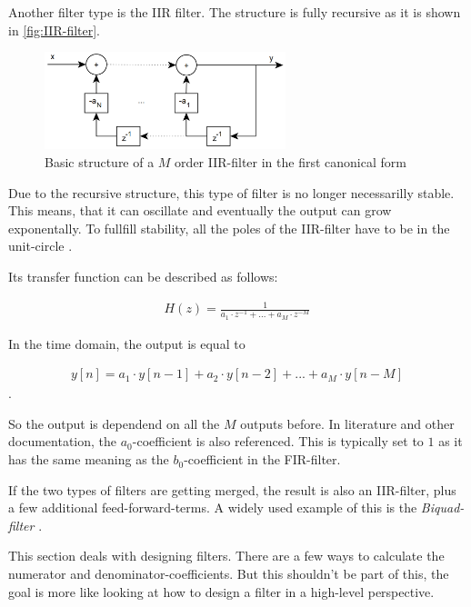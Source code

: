 Another filter type is the \ac{IIR} filter. The structure is fully recursive as it is shown in \autoref{fig:IIR-filter}.

\begin{figure}[!h]
    \centering
    \includegraphics[width=7cm]{img/iir.png}
    \caption{Basic structure of a $M$ order \ac{IIR}-filter in the first canonical form \cite{meyer_signalverarbeitung}}
    \label{fig:IIR-filter}
\end{figure}

Due to the recursive structure, this type of filter is no longer necessarilly stable. This means, that it can
oscillate and eventually the output can grow exponentally. To fullfill stability, all the poles of the
\ac{IIR}-filter have to be in the unit-circle \cite{meyer_signalverarbeitung}.

Its transfer function can be described as follows:

\begin{align}
    H(z) = \frac{1}{a_1 \cdot z^{-1} + ... + a_M \cdot z^{-M}}
\end{align}

In the time domain, the output is equal to

\begin{align}
    y[n] = a_1 \cdot y[n-1] + a_2 \cdot y[n-2] + ... + a_M \cdot y[n-M]
\end{align}
.

So the output is dependend on all the $M$ outputs before. In literature and other documentation,
the $a_0$-coefficient is also referenced. This is typically set to $1$ as it has the same meaning as
the $b_0$-coefficient in the \ac{FIR}-filter.

If the two types of filters are getting merged, the result is also an \ac{IIR}-filter, plus
a few additional feed-forward-terms. A widely used example of this is the \textit{Biquad-filter} \cite{arm_dsp}.



This section deals with designing filters. There are a few ways to calculate the numerator and
denominator-coefficients. But this shouldn't be part of this, the goal is more like looking at
how to design a filter in a high-level perspective.

